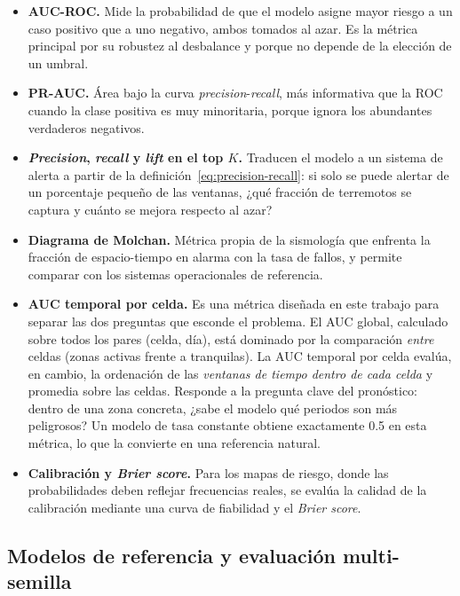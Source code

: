 \begin{itemize}
  \item \textbf{AUC-ROC.} Mide la probabilidad de que el modelo asigne mayor riesgo a un caso
        positivo que a uno negativo, ambos tomados al azar. Es la métrica principal por su
        robustez al desbalance y porque no depende de la elección de un umbral.
  \item \textbf{PR-AUC.} Área bajo la curva \textit{precision}-\textit{recall}, más informativa
        que la ROC cuando la clase positiva es muy minoritaria, porque ignora los abundantes
        verdaderos negativos.
  \item \textbf{\textit{Precision}, \textit{recall} y \textit{lift} en el top \(K\).} Traducen
        el modelo a un sistema de alerta a partir de la definición~\eqref{eq:precision-recall}:
        si solo se puede alertar de un porcentaje pequeño de las ventanas, ¿qué fracción de
        terremotos se captura y cuánto se mejora respecto al azar?
  \item \textbf{Diagrama de Molchan.} Métrica propia de la sismología que enfrenta la fracción
        de espacio-tiempo en alarma con la tasa de fallos, y permite comparar con los sistemas
        operacionales de referencia.
  \item \textbf{AUC temporal por celda.} Es una métrica diseñada en este trabajo para separar
        las dos preguntas que esconde el problema. El AUC global, calculado sobre todos los
        pares (celda, día), está dominado por la comparación \emph{entre} celdas (zonas activas
        frente a tranquilas). La AUC temporal por celda evalúa, en cambio, la ordenación de las
        \emph{ventanas de tiempo dentro de cada celda} y promedia sobre las celdas. Responde a
        la pregunta clave del pronóstico: dentro de una zona concreta, ¿sabe el modelo qué
        periodos son más peligrosos? Un modelo de tasa constante obtiene exactamente 0.5 en
        esta métrica, lo que la convierte en una referencia natural.
  \item \textbf{Calibración y \textit{Brier score}.} Para los mapas de riesgo, donde las
        probabilidades deben reflejar frecuencias reales, se evalúa la calidad de la
        calibración mediante una curva de fiabilidad y el \textit{Brier score}.
\end{itemize}

\subsection{Modelos de referencia y evaluación multi-semilla}
\label{md-baselines}

